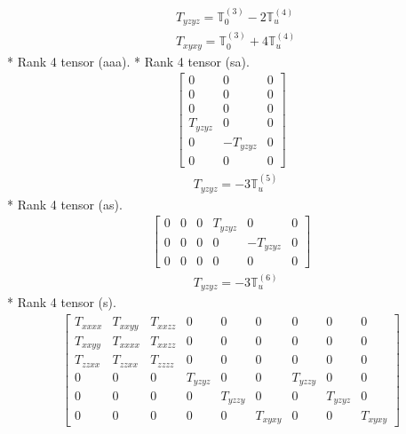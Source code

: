 \documentclass[fleqn,8pt,landscape]{jsarticle}
\begin{document}
\begin{align*}
& T_{yzyz} = \mathbb{T}_{0}^{(3)} - 2 \mathbb{T}_{u}^{(4)} \\
& T_{xyxy} = \mathbb{T}_{0}^{(3)} + 4 \mathbb{T}_{u}^{(4)}
\end{align*}
* Rank 4 tensor (aaa).
* Rank 4 tensor (sa).
\begin{align*}
\begin{bmatrix} 0 & 0 & 0 \\ 0 & 0 & 0 \\ 0 & 0 & 0 \\ T_{yzyz} & 0 & 0 \\ 0 & - T_{yzyz} & 0 \\ 0 & 0 & 0 \end{bmatrix}
\end{align*}
\begin{align*}
& T_{yzyz} = - 3 \mathbb{T}_{u}^{(5)}
\end{align*}
* Rank 4 tensor (as).
\begin{align*}
\begin{bmatrix} 0 & 0 & 0 & T_{yzyz} & 0 & 0 \\ 0 & 0 & 0 & 0 & - T_{yzyz} & 0 \\ 0 & 0 & 0 & 0 & 0 & 0 \end{bmatrix}
\end{align*}
\begin{align*}
& T_{yzyz} = - 3 \mathbb{T}_{u}^{(6)}
\end{align*}
* Rank 4 tensor (s).
\begin{align*}
\begin{bmatrix} T_{xxxx} & T_{xxyy} & T_{xxzz} & 0 & 0 & 0 & 0 & 0 & 0 \\ T_{xxyy} & T_{xxxx} & T_{xxzz} & 0 & 0 & 0 & 0 & 0 & 0 \\ T_{zzxx} & T_{zzxx} & T_{zzzz} & 0 & 0 & 0 & 0 & 0 & 0 \\ 0 & 0 & 0 & T_{yzyz} & 0 & 0 & T_{yzzy} & 0 & 0 \\ 0 & 0 & 0 & 0 & T_{yzzy} & 0 & 0 & T_{yzyz} & 0 \\ 0 & 0 & 0 & 0 & 0 & T_{xyxy} & 0 & 0 & T_{xyxy} \end{bmatrix}
\end{align*}
\end{document}
